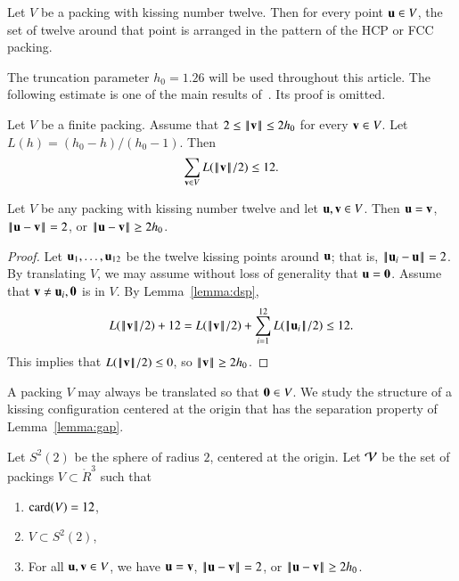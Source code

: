 \documentclass{llncs}
\begin{document}
%


\begin{theorem}\label{thm:fc} 
  Let $V$ be a packing with kissing number twelve.  Then for every point $\u\in
  V$, the set of twelve around that point is arranged in the pattern
  of the HCP or FCC packing.
\end{theorem}
%
%
%

The truncation parameter $h_0=1.26$ will be used throughout this article.
The following estimate is one of the main results of~\cite{DSP}.  Its proof
is omitted.

\begin{lemma}\label{lemma:dsp}
Let $V$ be a finite packing.  Assume that $2\le \normo{\v}\le 2h_0$ for
every $\v\in V$.  Let $L(h) = (h_0-h)/(h_0-1)$.  Then
\begin{equation}\label{eqn:L}
\sum_{\v\in V} L(\normo{\v}/2) \le 12.
\end{equation}
\end{lemma}

\begin{lemma} \label{lemma:gap}
  Let $V$ be any packing with kissing number twelve and let $\u,\v\in V$.
  Then $\u=\v$, $\norm{\u}{\v}=2$, or $\norm{\u}{\v} \ge 2h_0$.
\end{lemma}


\begin{proof} Let $ \u_1,\ldots, \u_{12}$ be the twelve kissing points
  around $\u$; that is, $\norm{\u_i}{\u}=2$.  
By translating $V$, we may assume without
loss of generality that $\u=\orz$.  Assume that $\v\ne \u_i,\orz$ is in $V$.   
By Lemma~\ref{lemma:dsp},
\[
   L(\normo{\v}/2)  + 12 
  =  L(\normo{\v}/2) + \sum_{i=1}^{12} L(\normo{\u_i}/2)  \le 12.
\]
This implies that $L(\normo{\v}/2)\le 0$, so $\normo{ \v}\ge 2h_0$.
\end{proof}

A packing $V$ may always be translated so that $\orz\in V$.  We study
the structure of a kissing configuration centered at the origin that
has the separation property of Lemma~\ref{lemma:gap}.

\begin{definition}[$S^2(2)$,~$\CalV$]
  Let $S^2(2)$ be the sphere of radius $2$, centered at the origin.  Let
  $\CalV$ be the set of packings $V\subset \ring{R}^3$ such that
\begin{enumerate}\wasitemize 
\item $\card(V) = 12$,
\item $V\subset S^2(2)$,
\item For all $\u,\v\in V$, we have $\u=\v$, $\norm{\u}{\v}=2$,
or $\norm{\u}{\v}\ge 2h_0$.
\end{enumerate}\wasitemize 
{}%
%
\end{definition}
\end{document}
